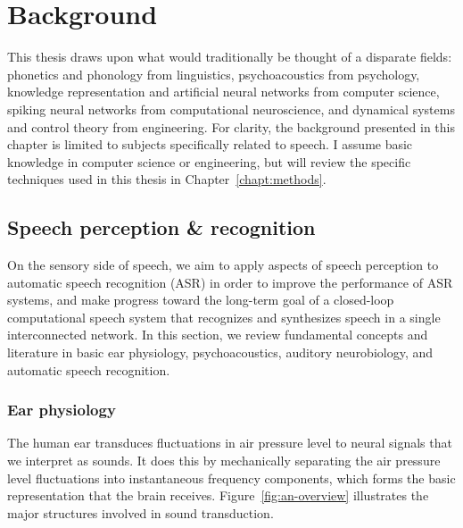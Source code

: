 \chapter{Background}
\label{chapt:bg}

This thesis draws upon
what would traditionally be thought of a disparate fields:
phonetics and phonology from linguistics,
psychoacoustics from psychology,
knowledge representation
and artificial neural networks from computer science,
spiking neural networks
from computational neuroscience,
and dynamical systems and control theory
from engineering.
For clarity, the background presented
in this chapter is limited
to subjects specifically related to speech.
I assume basic knowledge in
computer science or engineering,
but will review the specific techniques
used in this thesis
in Chapter~\ref{chapt:methods}.

\section{Speech perception \& recognition}

On the sensory side of speech,
we aim to apply aspects of speech perception
to automatic speech recognition (ASR)
in order to
improve the performance of ASR systems,
and make progress toward
the long-term goal of a closed-loop
computational speech system
that recognizes and synthesizes speech
in a single interconnected network.
In this section,
we review fundamental concepts and literature
in basic ear physiology,
psychoacoustics,
auditory neurobiology,
and automatic speech recognition.

\subsection{Ear physiology}

The human ear transduces fluctuations in
air pressure level to neural signals
that we interpret as sounds.
It does this by mechanically
separating the air pressure level fluctuations
into instantaneous frequency components,
which forms the basic representation
that the brain receives.
Figure~\ref{fig:an-overview} illustrates
the major structures involved
in sound transduction.



